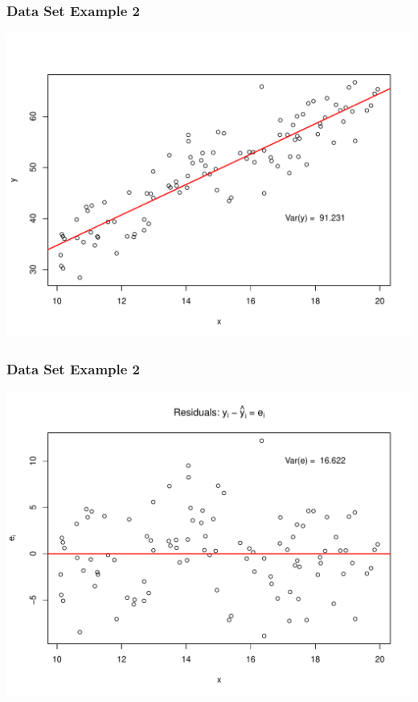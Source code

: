 \documentclass[handout]{beamer}
\begin{document}
\begin{frame}[fragile]
\frametitle{Data Set Example 2}

\begin{center}
\includegraphics[width=\textwidth]{figure/plot3}
\end{center}

\end{frame}


\begin{frame}[fragile]
\frametitle{Data Set Example 2}

\begin{center}
\includegraphics[width=\textwidth]{figure/plot4}
\end{center}

\end{frame}
\end{document}
